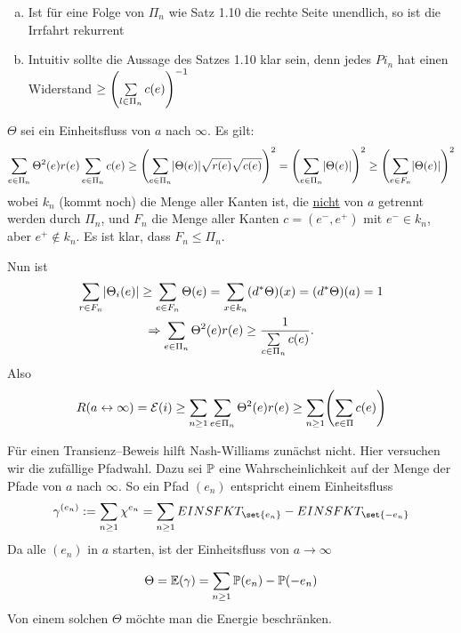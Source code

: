 \begin{bemerkung}
	\begin{enumerate}[a)]
		\item Ist für eine Folge von $\Pi_n$ wie Satz 1.10 die rechte Seite unendlich, so ist die Irrfahrt rekurrent
		\item Intuitiv sollte die Aussage des Satzes  1.10 klar sein, denn jedes $Pi_n$ hat einen Widerstand $ \geq \left(\sum\limits_{l\in \Pi_n} c(e)\right)^{-1}$
	\end{enumerate}
\end{bemerkung}
\begin{beweis}
	$\Theta$ sei ein Einheitsfluss von $a$ nach $\infty$. Es gilt:
	\begin{align}
		\sum\limits_{e \in \Pi_n} \Theta^2(e) r(e) \sum\limits_{e \in \Pi_n} c(e) \geq \left(\sum\limits_{e \in \Pi_n}\lvert\Theta(e)\rvert \sqrt{r(e)}\sqrt{c(e)}\right)^2 = \left(\sum\limits_{e \in \Pi_n}\lvert\Theta(e)\rvert\right)^2 \geq \left(\sum\limits_{e \in F_n}\lvert\Theta(e)\rvert \right)^2
	\end{align}
	wobei $k_n$ (kommt noch) die Menge aller Kanten ist, die \underline{nicht} von $a$ getrennt werden durch $\Pi_n$, und $F_n$ die Menge aller Kanten $c = (e^-,e^+)$ mit $e^- \in k_n$, aber $e^+ \notin k_n$. Es ist klar, dass $F_n \leq \Pi_n$.
	
	Nun ist 
	\begin{gather}
		\sum\limits_{r \in F_n} \lvert\Theta_i(e)\rvert \geq \sum\limits_{e \in F_n} \Theta(e) = \sum\limits_{x \in k_n} (d^*\Theta)(x) = (d^*\Theta)(a) = 1 \\
		\Rightarrow \sum\limits_{e \in \Pi_n} \Theta^2(e)r(e) \geq \frac{1}{\sum\limits_{c \in \Pi_n}c(e)}.
	\end{gather}
	Also 
	\begin{align}
		R (a \leftrightarrow \infty) = \mathcal{E}(i) \geq \sum\limits_{n \geq 1}\sum\limits_{e\in \Pi_n} \Theta^2(e)r(e) \geq \sum\limits_{n \geq 1} \enb{\sum\limits_{e \in\Pi} c(e)}
	\end{align}
	
	
\end{beweis}

Für einen Transienz--Beweis hilft Nash-Williams zunächst nicht. Hier versuchen wir die zufällige Pfadwahl. Dazu sei $\mathbb{P}$ eine Wahrscheinlichkeit auf der Menge der Pfade von $a$ nach $\infty$. So ein Pfad $(e_n)$ entspricht einem Einheitsfluss
\begin{gather}
	\gamma^{(e_n)} := \sum\limits_{n \geq 1} \chi^{e_n} = \sum\limits_{n \geq 1} EINSFKT_{\set{e_n}}- EINSFKT_{\set{-e_n}}
\end{gather}
Da alle $(e_n)$ in $a$ starten, ist der Einheitsfluss von $a \to \infty$  

\begin{align}
	\Theta = \EW{\gamma} = \sum\limits_{n \geq 1}\prop{e_n} - \prop{-e_n}
\end{align}
Von einem solchen $\Theta$ möchte man die Energie beschränken. 








